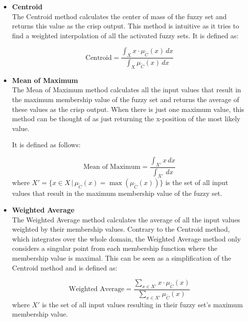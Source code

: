 \begin{itemize}
      \item \textbf{Centroid} \\
            The Centroid method calculates the center of mass of the fuzzy set and returns this value as the crisp output. This method is intuitive as it tries to find a weighted interpolation of all the activated fuzzy sets. It is defined as:

            \begin{equation}
                  \text{Centroid} = \frac{\int_X x \cdot \mu_{\tilde{C}}(x) \, dx}{\int_X \mu_{\tilde{C}}(x) \, dx}
            \end{equation}

      \item \textbf{Mean of Maximum} \\
            The Mean of Maximum method calculates all the input values that result in the maximum membership value of the fuzzy set and returns the average of these values as the crisp output. When there is just one maximum value, this method can be thought of as just returning the x-position of the most likely value.

            It is defined as follows:

            \begin{equation}
                  \text{Mean of Maximum} = \frac{\int_{X'} x \, dx}{\int_{X'}  \, dx}
            \end{equation}
            where $X' = \{x \in X \, | \, \mu_{\tilde{C}}(x) = \max(\mu_{\tilde{C}}(x))\}$ is the set of all input values that result in the maximum membership value of the fuzzy set.



      \item \textbf{Weighted Average} \\
            The Weighted Average method calculates the average of all the input values weighted by their membership values. Contrary to the Centroid method, which integrates over the whole domain, the Weighted Average method only considers a singular point from each membership function where the membership value is maximal. This can be seen as a simplification of the Centroid method and is defined as:

            \begin{equation}
                  \text{Weighted Average} = \frac{\sum_{x \in X'} x \cdot \mu_{\tilde{C}}(x)}{\sum_{x \in X'} \mu_{\tilde{C}}(x)}
            \end{equation}
            where $X'$ is the set of all input values resulting in their fuzzy set's maximum membership value.
\end{itemize}

